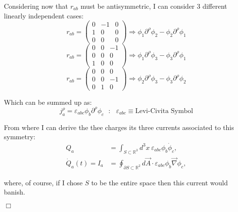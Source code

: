 \documentclass[12pt]{article}
\newcommand{\qedwhite}{\hfill \ensuremath{\Box}}
\begin{document}
Considering now that \( r_{ab} \) must be antisymmetric, I can consider 3 different linearly independent cases:
\[
    r_{ab} =    \left(  
                        \begin{matrix}
                            0 & -1 & 0 \\
                            1 &  0 & 0 \\
                            0 &  0 & 0
                        \end{matrix} 
                \right)
    \Rightarrow \phi_1\partial^\rho \phi_2 - \phi_2 \partial^\rho \phi_1 
\]
\[
    r_{ab} =    \left(  
                        \begin{matrix}
                            0 & 0 & -1 \\
                            0 & 0 &  0 \\
                            1 & 0 &  0
                        \end{matrix} 
                \right)
    \Rightarrow \phi_1\partial^\rho \phi_3 - \phi_3 \partial^\rho \phi_1 
\]
\[
    r_{ab} =    \left(  
                        \begin{matrix}
                            0 & 0 &  0 \\
                            0 & 0 & -1 \\
                            0 & 1 &  0
                        \end{matrix} 
                \right)
    \Rightarrow \phi_2\partial^\rho \phi_3 - \phi_3 \partial^\rho \phi_2 
\]

Which can be summed up as:
\[
    j^\rho_a = \varepsilon_{abc} \phi_b \partial^\rho \phi_c ~~~:~~~ \varepsilon_{abc} \equiv \text{Levi-Civita Symbol}
\]

\newpage
From where I can derive the thee charges its three currents associated to this symmetry:
\begin{align*}
    Q_a &= \int_{S\subset\mathbb{R}^3} d^3 x ~ \varepsilon_{abc} \phi_b \dot{\phi}_c,\\
    \dot{Q}_a(t) = I_a &= \oint_{\partial S\subset\mathbb{R}^2} d\vec{A} \cdot \varepsilon_{abc} \phi_b \vec{\nabla} \phi_c,
\end{align*}

where, of course, if I chose \(S\) to be the entire space then this current would banish.

\qedwhite
\end{document}
